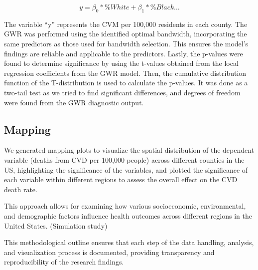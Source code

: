 \documentclass[
]{article}
\begin{document}
\[
y = \beta_0*\%White +\beta_1* \%Black\dots
\]

The variable ``y'' represents the CVM per 100,000 residents in each
county. The GWR was performed using the identified optimal bandwidth,
incorporating the same predictors as those used for bandwidth selection.
This ensures the model's findings are reliable and applicable to the
predictors. Lastly, the p-values were found to determine significance by
using the t-values obtained from the local regression coefficients from
the GWR model. Then, the cumulative distribution function of the
T-distribution is used to calculate the p-values. It was done as a
two-tail test as we tried to find significant differences, and degrees
of freedom were found from the GWR diagnostic output.

\subsection{Mapping}\label{sec-mapping}

We generated mapping plots to visualize the spatial distribution of the
dependent variable (deaths from CVD per 100,000 people) across different
counties in the US, highlighting the significance of the variables, and
plotted the significance of each variable within different regions to
assess the overall effect on the CVD death rate.~

This approach allows for examining how various socioeconomic,
environmental, and demographic factors influence health outcomes across
different regions in the United States. (Simulation study)

This methodological outline ensures that each step of the data handling,
analysis, and visualization process is documented, providing
transparency and reproducibility of the research findings.

\begin{figure}


\caption{\label{fig-1}}

\end{figure}%
\end{document}
